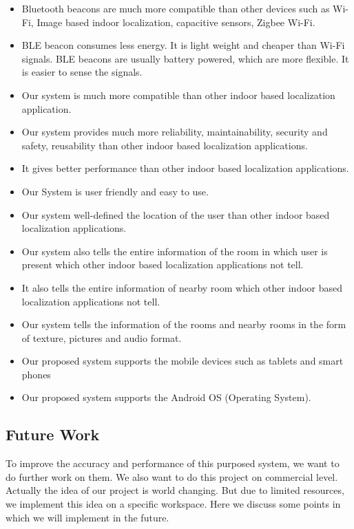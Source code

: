 \begin{itemize}
\item Bluetooth beacons are much more compatible than other devices such as Wi-Fi, Image based indoor localization, capacitive sensors, Zigbee Wi-Fi.
\item BLE beacon consumes less energy. It is light weight and cheaper than Wi-Fi signals. BLE beacons are usually battery powered, which are more flexible. It is easier to sense the signals. 
\item Our system is much more compatible than other indoor based localization application.
\item Our system provides much more reliability, maintainability, security and safety, reusability than other indoor based localization applications.
\item It gives better performance than other indoor based localization applications.
\item Our System is user friendly and easy to use.
\item Our system well-defined the location of the user than other indoor based localization applications.
\item Our system also tells the entire information of the room in which user is present which other indoor based localization applications not tell.
\item It also tells the entire information of nearby room which other indoor based localization applications not tell.
\item Our system tells the information of the rooms and nearby rooms in the form of texture, pictures and audio format.
\item Our proposed system supports the mobile devices such as  tablets and smart phones
\item Our proposed system supports the Android OS (Operating System).

\end{itemize}

\subsection{Future Work}
To improve the accuracy and performance of this purposed system, we want to do further work on them. We also want to do this project on commercial level. Actually the idea of our project is world changing. But due to limited resources, we implement this idea on a specific workspace. Here we discuss some points in which we will implement in the future.\

